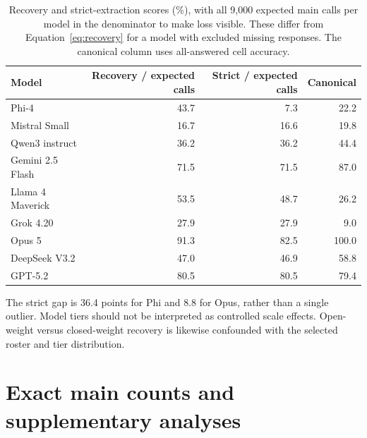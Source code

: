\documentclass{article}
\newcommand{\pct}{\%}
\begin{document}
\begin{table}[h]
\centering
\small
\caption{Recovery and strict-extraction scores (\pct), with all 9,000 expected
main calls per model in the denominator to make loss visible. These differ from
Equation~\ref{eq:recovery} for a model with excluded missing responses.
The canonical column uses all-answered cell accuracy.}
\begin{tabular}{lrrr}
\toprule
Model & Recovery / expected calls & Strict / expected calls & Canonical \\
\midrule
Phi-4 & 43.7 & 7.3 & 22.2 \\
Mistral Small & 16.7 & 16.6 & 19.8 \\
Qwen3 instruct & 36.2 & 36.2 & 44.4 \\
Gemini 2.5 Flash & 71.5 & 71.5 & 87.0 \\
Llama 4 Maverick & 53.5 & 48.7 & 26.2 \\
Grok 4.20 & 27.9 & 27.9 & 9.0 \\
Opus 5 & 91.3 & 82.5 & 100.0 \\
DeepSeek V3.2 & 47.0 & 46.9 & 58.8 \\
GPT-5.2 & 80.5 & 80.5 & 79.4 \\
\bottomrule
\end{tabular}
\end{table}

The strict gap is 36.4 points for Phi and 8.8 for Opus, rather than a single
outlier. Model tiers should not be interpreted as controlled scale effects.
Open-weight versus closed-weight recovery is likewise confounded with the
selected roster and tier distribution.

\section{Exact main counts and supplementary analyses}
\label{app:tables}
\end{document}
